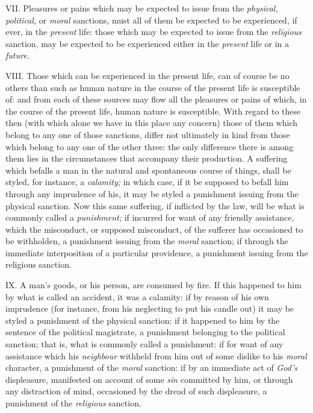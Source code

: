 \documentclass[12pt]{report}
\begin{document}
VII. Pleasures or pains which may be expected to issue from the
\emph{physical, political,} or \emph{moral} sanctions, must all of them
be expected to be experienced, if ever, in the \emph{present} life:
those which may be expected to issue from the \emph{religious} sanction,
may be expected to be experienced either in the \emph{present} life or
in a \emph{future.} \emph{}

VIII. Those which can be experienced in the present life, can of course
be no others than such as human nature in the course of the present life
is susceptible of: and from each of these sources may flow all the
pleasures or pains of which, in the course of the present life, human
nature is susceptible. With regard to these then (with which alone we
have in this place any concern) those of them which belong to any one of
those sanctions, differ not ultimately in kind from those which belong
to any one of the other three: the only difference there is among them
lies in the circumstances that accompany their production. A suffering
which befalls a man in the natural and spontaneous course of things,
shall be styled, for instance, a \emph{calamity;} in which case, if it
be supposed to befall him through any imprudence of his, it may be
styled a punishment issuing from the physical sanction. Now this same
suffering, if inflicted by the law, will be what is commonly called a
\emph{punishment;} if incurred for want of any friendly assistance,
which the misconduct, or supposed misconduct, of the sufferer has
occasioned to be withholden, a punishment issuing from the \emph{moral}
sanction; if through the immediate interposition of a particular
providence, a punishment issuing from the religious sanction.

IX. A man's goods, or his person, are consumed by fire. If this happened
to him by what is called an accident, it was a calamity: if by reason of
his own imprudence (for instance, from his neglecting to put his candle
out) it may be styled a punishment of the physical sanction: if it
happened to him by the sentence of the political magistrate, a
punishment belonging to the political sanction; that is, what is
commonly called a punishment: if for want of any assistance which his
\emph{neighbour} withheld from him out of some dislike to his
\emph{moral} character, a punishment of the \emph{moral} sanction: if by
an immediate act of \emph{God's} displeasure, manifested on account of
some \emph{sin} committed by him, or through any distraction of mind,
occasioned by the dread of such displeasure, a punishment of the
\emph{religious} sanction.
\end{document}
